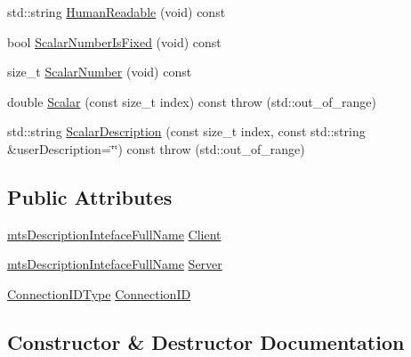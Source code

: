 \begin{DoxyCompactItemize}
std\+::string \hyperlink{classmts_description_connection_a3c62f6ce3ba5c468c8b507b1b1ba710a}{Human\+Readable} (void) const 
\item 
bool \hyperlink{classmts_description_connection_aa8423d48da8b8cb42cd8e1e41cf0bbb6}{Scalar\+Number\+Is\+Fixed} (void) const 
\item 
size\+\_\+t \hyperlink{classmts_description_connection_ae02ed369e99f50b576731ca12b4f1253}{Scalar\+Number} (void) const 
\item 
double \hyperlink{classmts_description_connection_ac0dc917c7de0858bb16452a80ff1e3f3}{Scalar} (const size\+\_\+t index) const   throw (std\+::out\+\_\+of\+\_\+range)
\item 
std\+::string \hyperlink{classmts_description_connection_a2c190e140c86d65f5d70bb80861585a9}{Scalar\+Description} (const size\+\_\+t index, const std\+::string \&user\+Description=\char`\"{}\char`\"{}) const   throw (std\+::out\+\_\+of\+\_\+range)
\end{DoxyCompactItemize}
\subsection*{Public Attributes}
\begin{DoxyCompactItemize}
\item 
\hyperlink{classmts_description_inteface_full_name}{mts\+Description\+Inteface\+Full\+Name} \hyperlink{classmts_description_connection_af112dac883a91f0361c6f01bc3cd33d5}{Client}
\item 
\hyperlink{classmts_description_inteface_full_name}{mts\+Description\+Inteface\+Full\+Name} \hyperlink{classmts_description_connection_a7b9d1dbdb53304b7e999fbf7877179b7}{Server}
\item 
\hyperlink{mts_forward_declarations_8h_ad3543bb11742e1766374ec96016d6547}{Connection\+I\+D\+Type} \hyperlink{classmts_description_connection_a1de49cbdcc537cae81975772fff86798}{Connection\+I\+D}
\end{DoxyCompactItemize}


\subsection{Constructor \& Destructor Documentation}
\hypertarget{classmts_description_connection_ab51d91468f65fbe0b6046a71c839f2a4}{}
